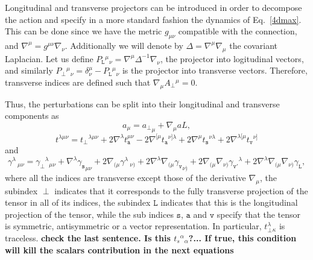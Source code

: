 \documentclass[aps,prd,12pt,twocolumn,superscriptaddress,showpacs,showkeys,reprint%
]{revtex4-1}
\newcommand\nab[1]{\nabla_{{#1}}}
\renewcommand{\(}{\left(}
\renewcommand{\)}{\right)}
\renewcommand{\[}{\left[}
\renewcommand{\]}{\right]}
\newcommand{\dn}[2]{{\mathrm{d}}^{#1}{#2}\;}
\newcommand{\hl}[1]{{\color{red} \bfseries{#1}}}
\begin{document}
Longitudinal and transverse projectors can be introduced in order to decompose the action and specify in a more standard fashion the dynamics of Eq.~\eqref{4dmax}. This can be done since we have the metric $g_{\mu\nu}$ compatible with the connection, and $\nabla^\mu=g^{\mu\nu}\nabla_\nu$. Additionally we will denote by $\Delta = \nabla^\mu\nabla_\mu$ the covariant Laplacian. Let us define $P_{\texttt{L}}{}^\mu{}_\nu=\nabla^\mu\Delta^{-1} \nabla_\nu $, the projector into logitudinal vectors, and similarly $P_\perp{}^\mu{}_\nu=\delta^\mu_\nu -P_{\texttt{L}}{}^\mu{}_\nu$ is the projector into transverse vectors. Therefore, transverse indices are defined such that $\nabla_\mu A_\perp{}^{\mu}=0$.

Thus, the perturbations can be split into their longitudinal and transverse components as
\begin{dmath}
  a_\mu = {a_\perp}_{\mu} + {\nabla}_{\mu}{aL},
\end{dmath}
\begin{dmath}
  {t}^{\lambda \mu \nu} =
  {t_\perp}^{\lambda \mu \nu}
  + 2  {\nabla}^{\lambda} {t_{\texttt{a}}^{\mu \nu}}
  - 2  {\nabla}^{[\mu}{{t_{\texttt{a}}}^{\nu] \lambda}} 
  + 2  {\nabla}^{\mu}{{t_{\texttt{s}}}^{\nu \lambda}}
  + 2  {\nabla}^{\lambda [\mu}{{t_{\texttt{v}}}^{\nu]}}
\end{dmath}
and
\begin{dmath}
  {\gamma}^{\lambda}\,_{\mu \nu}  =
  {\gamma_\perp}^{\lambda}{}_{\mu \nu}
  + {\nabla}^{\lambda}{{\gamma_{\texttt{s}}}_{\mu \nu}}
  + 2  {\nabla}_{(\mu}{{\gamma}^{\lambda}\,_{\nu)}}
  + 2  {\nabla}^{\lambda}\nabla_{(\mu}{{\gamma_{\texttt{v}}}_{\nu)}}
  + 2  \nab{(\mu} \nab{\nu)} {{\gamma_{\texttt{v}'}}^{\lambda}} 
  + 2  {\nabla}^{\lambda}\nab{(\mu} \nab{\nu)}{\gamma_{\texttt{L}}},
\end{dmath}
where all the indices are transverse except those of the derivative $\nabla_\mu$, the subindex $\perp$ indicates that it corresponds to the fully transverse projection of the tensor in all of its indices, the subindex ${\texttt{L}}$ indicates that this is the longitudinal projection of the tensor, while the sub indices $\texttt{s}$, $\texttt{a}$ and $\texttt{v}$ specify that the tensor is symmetric, antisymmetric or a vector representation. In particular, $t_\perp^{\lambda}{}_\kappa$ is traceless. \hl{check the last sentence. Is this ${t_s}^{\alpha}{}_{\alpha}$?... If true, this condition will kill the scalars contribution in the next equations}
\end{document}
